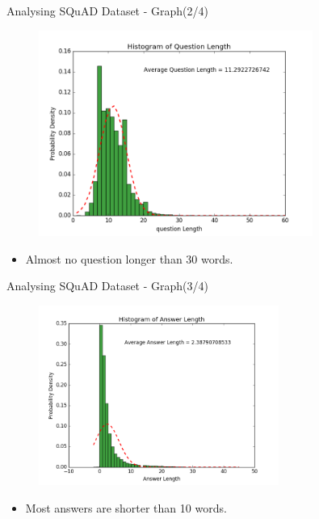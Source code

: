 \documentclass[10pt]{beamer}
\begin{document}
\begin{frame}[fragile]{Analysing SQuAD Dataset - Graph(2/4)}

	\begin{figure}[H]
		\centering
		{\includegraphics[width=0.8\textwidth]{includes/question_hist_fin.png}\label{fig:f1}}
	\end{figure}

	\begin{itemize}
		\item Almost no question longer than 30 words.
	\end{itemize}
\end{frame}

\begin{frame}[fragile]{Analysing SQuAD Dataset - Graph(3/4)}

	\begin{figure}[H]
		\centering
		{\includegraphics[width=0.7\textwidth]{includes/ans_hist_fin.png}\label{fig:f1}}
	\end{figure}

	\begin{itemize}
		\item Most answers
			are shorter than 10 words.
	\end{itemize}
\end{frame}
\end{document}
